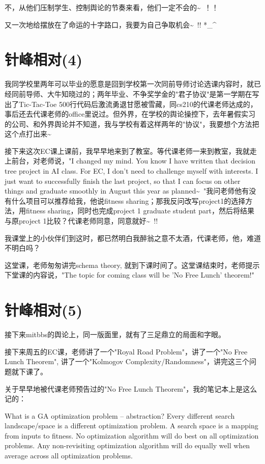 \documentclass[12pt]{book}
\begin{document}
不，从他们压制学生、控制舆论的节奏来看，他们一定不会的\textasciitilde{}~！！

又一次地给摆放在了命运的十字路口，我要为自己争取机会\textasciitilde{}~!!  *\_\^{}

\section{针峰相对(4)}
\label{sec-34-4}

我同学校里两年可以毕业的愿意是回到学校第一次同前导师讨论选课内容时，就已经同前导师、大牛知晓过的；两年毕业、不争奖学金的"君子协议"是第一学期在写出了Tic-Tac-Toe 500行代码后激流勇退甘愿被雪藏，同cs210的代课老师达成的，事后还去代课老师的office里说过。但外界，在学校的舆论操控下，去年暑假实习的公司、和外界舆论并不知道，我与学校有着这样两年的"协议"，我要想个方法把这个点打出来\textasciitilde{}~

接下来这次EC课上课前，我早早地来到了教室。等代课老师一来到教室，我就走上前台，对老师说，"I changed my mind.   You know I have written that decision tree project in AI class.   For EC, I don't need to challenge myself with interests.   I just want to successfully finish the last project, so that I can focus on other things and graduate smoothly in August this year as planned\textasciitilde{}~"我问老师他有没有什么项目可以推荐给我，他说fitness sharing；那我反问改写project1的选择方法，用fitness sharing，同时也完成project 1 graduate student part，然后将结果与原project 1比较？代课老师同意，同意就好\textasciitilde{}~!!

我课堂上的小伙伴们到这时，都已然明白我醉翁之意不太酒，代课老师，他，难道不明白吗？

这堂课，老师匆匆讲完schema theory, 就到下课时间了。这堂课结束时，老师提示下堂课的内容说，"The topic for coming class will be 'No Free Lunch' theorem!"

\section{针峰相对(5)}
\label{sec-34-5}

接下来mitbbs的舆论上，同一版面里，就有了三足鼎立的局面和字眼。

接下来周五的EC课，老师讲了一个"Royal Road Problem"，讲了一个"No Free Lunch Theorem", 讲了一个"Kolmogov Complexity/Randomness"，讲完这三个问题就下课了。

关于早早地被代课老师预告过的"No Free Lunch Theorem"，我的笔记本上是这么记的：

What is a GA optimization problem -- abstraction?  Every different search landscape/space is a different optimization problem.  A search space is a mapping from inputs to fitness.  No optimization algorithm will do best on all optimization problems.  Any non-revisiting optimization algorithm will do equally well when average across all optimization problems.
\end{document}
